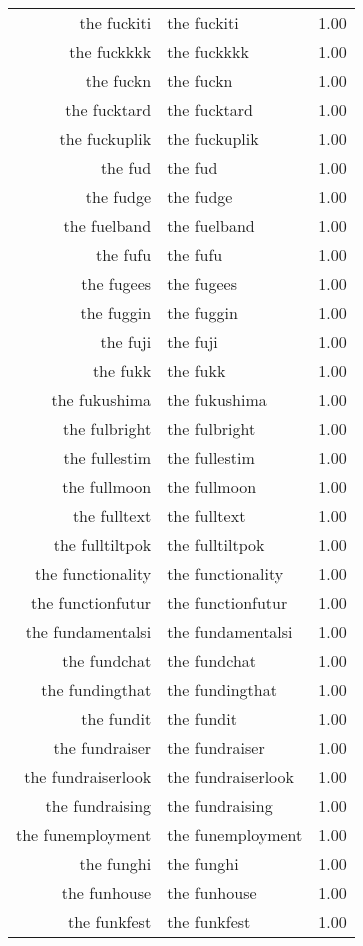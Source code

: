 \begin{table}[ht]
\begin{tabular}{rlr}
  the fuckiti & the fuckiti & 1.00 \\ 
  the fuckkkk & the fuckkkk & 1.00 \\ 
  the fuckn & the fuckn & 1.00 \\ 
  the fucktard & the fucktard & 1.00 \\ 
  the fuckuplik & the fuckuplik & 1.00 \\ 
  the fud & the fud & 1.00 \\ 
  the fudge & the fudge & 1.00 \\ 
  the fuelband & the fuelband & 1.00 \\ 
  the fufu & the fufu & 1.00 \\ 
  the fugees & the fugees & 1.00 \\ 
  the fuggin & the fuggin & 1.00 \\ 
  the fuji & the fuji & 1.00 \\ 
  the fukk & the fukk & 1.00 \\ 
  the fukushima & the fukushima & 1.00 \\ 
  the fulbright & the fulbright & 1.00 \\ 
  the fullestim & the fullestim & 1.00 \\ 
  the fullmoon & the fullmoon & 1.00 \\ 
  the fulltext & the fulltext & 1.00 \\ 
  the fulltiltpok & the fulltiltpok & 1.00 \\ 
  the functionality & the functionality & 1.00 \\ 
  the functionfutur & the functionfutur & 1.00 \\ 
  the fundamentalsi & the fundamentalsi & 1.00 \\ 
  the fundchat & the fundchat & 1.00 \\ 
  the fundingthat & the fundingthat & 1.00 \\ 
  the fundit & the fundit & 1.00 \\ 
  the fundraiser & the fundraiser & 1.00 \\ 
  the fundraiserlook & the fundraiserlook & 1.00 \\ 
  the fundraising & the fundraising & 1.00 \\ 
  the funemployment & the funemployment & 1.00 \\ 
  the funghi & the funghi & 1.00 \\ 
  the funhouse & the funhouse & 1.00 \\ 
  the funkfest & the funkfest & 1.00 \\ 

\end{tabular}
\end{table}
